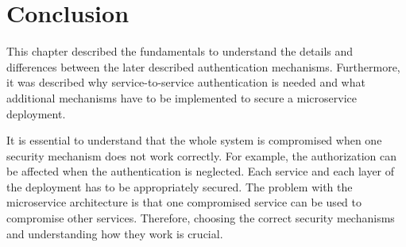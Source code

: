 \section{Conclusion}
This chapter described the fundamentals to understand the details and differences between the later described authentication mechanisms.
Furthermore, it was described why service-to-service authentication is needed and what additional mechanisms have to be implemented to secure a microservice deployment.

It is essential to understand that the whole system is compromised when one security mechanism does not work correctly.
For example, the authorization can be affected when the authentication is neglected.
Each service and each layer of the deployment has to be appropriately secured.
The problem with the microservice architecture is that one compromised service can be used to compromise other services.
Therefore, choosing the correct security mechanisms and understanding how they work is crucial. 

